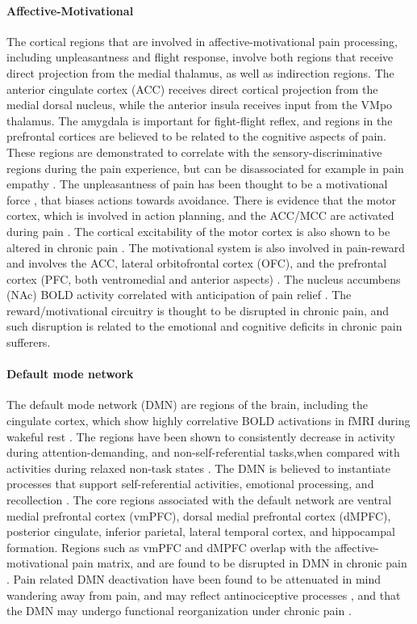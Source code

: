 \paragraph{Affective-Motivational}
The cortical regions that are involved in affective-motivational pain processing, including unpleasantness and flight response, involve both regions that receive direct projection from the medial thalamus, as well as indirection regions. The anterior cingulate cortex (ACC) receives direct cortical projection from the medial dorsal nucleus, while the anterior insula receives input from the VMpo thalamus. The amygdala is important for fight-flight reflex, and regions in the prefrontal cortices are believed to be related to the cognitive aspects of pain. These regions are demonstrated to correlate with the sensory-discriminative regions during the pain experience, but can be disassociated for example in pain empathy \cite{Singer2004}. The unpleasantness of pain has been thought to be a motivational force \cite{Auvray2010}, that biases actions towards avoidance. There is evidence that the motor cortex, which is involved in action planning, and the ACC/MCC are activated during pain \cite{Parker2016,Burns2016,Erpelding2013}. The cortical excitability of the motor cortex is also shown to be altered in chronic pain \cite{Parker2016}. The motivational system is also involved in pain-reward and involves the ACC, lateral orbitofrontal cortex (OFC), and the prefrontal cortex (PFC, both ventromedial and anterior aspects) \cite{Navratilova2015}. The nucleus accumbens (NAc) BOLD activity correlated with anticipation of pain relief \cite{Baliki2010}. The reward/motivational circuitry is thought to be disrupted in chronic pain, and such disruption is related to the emotional and cognitive deficits in chronic pain sufferers.

\paragraph{Default mode network}
The default mode network (DMN) are regions of the brain, including the cingulate cortex, which show highly correlative BOLD activations in fMRI during wakeful rest \cite{Greicius2003,Raichle2015}. The regions have been shown to consistently decrease in activity during attention-demanding, and non-self-referential tasks,when compared with activities during relaxed non-task states \cite{Raichle2015}. The DMN is believed to instantiate processes that support self-referential activities, emotional processing, and recollection \cite{Raichle2015}. The core regions associated with the default network are ventral medial prefrontal cortex (vmPFC), dorsal medial prefrontal cortex (dMPFC), posterior cingulate, inferior parietal, lateral temporal cortex, and hippocampal formation. Regions such as vmPFC and dMPFC overlap with the affective-motivational pain matrix, and are found to be disrupted in DMN in chronic pain \cite{Baliki2008}. Pain related DMN deactivation have been found to be attenuated  in mind wandering away from pain, and may reflect antinociceptive processes \cite{Kucyi2013}, and that the DMN may undergo functional reorganization under chronic pain \cite{Baliki2014}. 

